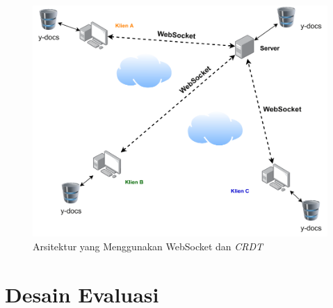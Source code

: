 \begin{figure}
    \centering
    \includegraphics[scale=0.42]{assets/skripsi/Arsitektur_WebSocket_CRDT}
    \caption{Arsitektur yang Menggunakan WebSocket dan \textit{CRDT}}
\end{figure}


\section{Desain Evaluasi}
\label{sec:desain_evaluasi}